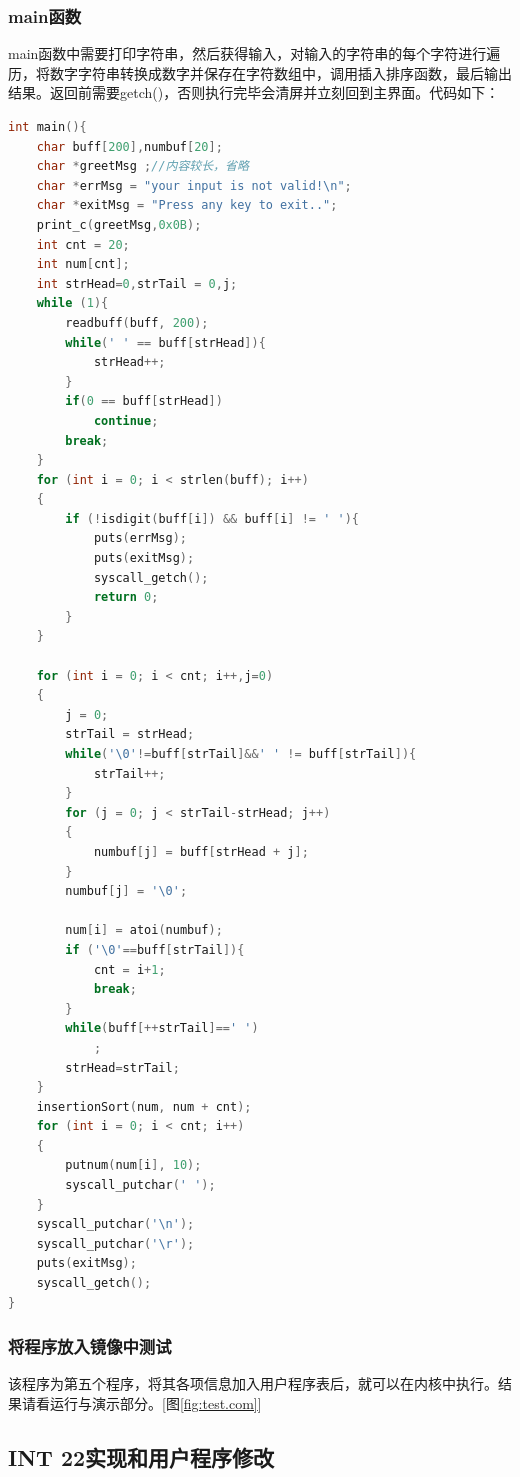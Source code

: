 \documentclass[a4paper, 11pt]{article} %
\begin{document}
\subsubsection{main函数}
main函数中需要打印字符串，然后获得输入，对输入的字符串的每个字符进行遍历，将数字字符串转换成数字并保存在字符数组中，调用插入排序函数，最后输出结果。返回前需要getch()，否则执行完毕会清屏并立刻回到主界面。代码如下：
\begin{lstlisting}[language={c},label=main,caption=main函数]
  int main(){
    char buff[200],numbuf[20];
    char *greetMsg ;//内容较长，省略
    char *errMsg = "your input is not valid!\n";
    char *exitMsg = "Press any key to exit..";
    print_c(greetMsg,0x0B);
    int cnt = 20;
    int num[cnt];
    int strHead=0,strTail = 0,j;
    while (1){
        readbuff(buff, 200);
        while(' ' == buff[strHead]){
            strHead++;
        }
        if(0 == buff[strHead])
            continue;
        break;
    }
    for (int i = 0; i < strlen(buff); i++)
    {
        if (!isdigit(buff[i]) && buff[i] != ' '){
            puts(errMsg);
            puts(exitMsg);
            syscall_getch();
            return 0;
        }
    }
    
    for (int i = 0; i < cnt; i++,j=0)
    {
        j = 0;
        strTail = strHead;
        while('\0'!=buff[strTail]&&' ' != buff[strTail]){
            strTail++;
        }
        for (j = 0; j < strTail-strHead; j++)
        {
            numbuf[j] = buff[strHead + j];
        }
        numbuf[j] = '\0';

        num[i] = atoi(numbuf);
        if ('\0'==buff[strTail]){
            cnt = i+1;
            break;        
        }
        while(buff[++strTail]==' ')
            ;
        strHead=strTail;
    }
    insertionSort(num, num + cnt);
    for (int i = 0; i < cnt; i++)
    {
        putnum(num[i], 10);
        syscall_putchar(' ');
    }
    syscall_putchar('\n');
    syscall_putchar('\r');
    puts(exitMsg);
    syscall_getch();
}
\end{lstlisting}
\subsubsection{将程序放入镜像中测试}
该程序为第五个程序，将其各项信息加入用户程序表后，就可以在内核中执行。结果请看运行与演示部分。[图\ref{fig:test.com}]

\subsection{INT 22实现和用户程序修改}
\end{document}
